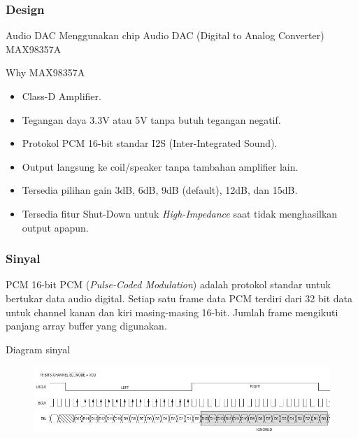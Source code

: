 \documentclass[table,dvipsnames,10pt]{beamer}
\begin{document}
	
	\begin{frame}
	\frametitle{Design}
	\begin{exampleblock}{Audio DAC}
		Menggunakan chip Audio DAC (Digital to Analog Converter) MAX98357A
	\end{exampleblock}
	\begin{exampleblock}{Why MAX98357A}
		\begin{itemize}
			\item Class-D Amplifier.
			\item Tegangan daya 3.3V atau 5V tanpa butuh tegangan negatif.
			\item Protokol PCM 16-bit standar I2S (Inter-Integrated Sound).
			\item Output langsung ke coil/speaker tanpa tambahan amplifier lain.
			\item Tersedia pilihan gain 3dB, 6dB, 9dB (default), 12dB, dan 15dB.
			\item Tersedia fitur Shut-Down untuk \textit{High-Impedance}
			saat tidak menghasilkan output apapun.
		\end{itemize}
	\end{exampleblock}	
	\end{frame}

	\begin{frame}
	\frametitle{Sinyal}
	\begin{exampleblock}{PCM 16-bit}
		PCM (\textit{Pulse-Coded Modulation}) adalah protokol standar untuk bertukar data audio digital.
		Setiap satu frame data PCM terdiri dari 32 bit data untuk channel kanan dan kiri masing-masing 16-bit.
		Jumlah frame mengikuti panjang array buffer yang digunakan.
	\end{exampleblock}
	\begin{exampleblock}{Diagram sinyal}
			\begin{figure}[H]
			\centering
			\includegraphics[width=\linewidth]{images/PCM}
		\end{figure}
	\end{exampleblock}	
	\end{frame}
\end{document}
